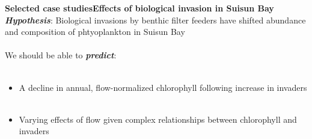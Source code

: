 \documentclass[serif]{beamer}\usepackage[]{graphicx}\usepackage[]{color}
\newcommand{\emtxt}[1]{\textbf{\textit{#1}}}
\begin{document}
\begin{frame}{\textbf{Selected case studies}}{\textbf{Effects of biological invasion in Suisun Bay}}
\emtxt{Hypothesis}: Biological invasions by benthic filter feeders have shifted abundance and composition of phtyoplankton in Suisun Bay \\~\\
We should be able to \emtxt{predict}: \\~\\
\begin{itemize}
\item A decline in annual, flow-normalized chlorophyll following increase in invaders\\~\\
\item Varying effects of flow given complex relationships between chlorophyll and invaders
\end{itemize}
\end{frame}
\end{document}
